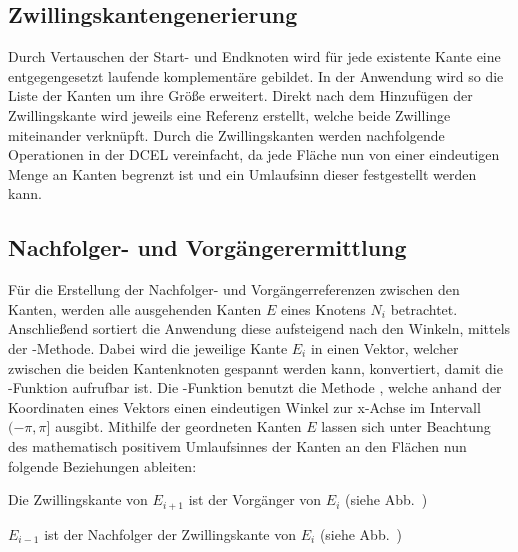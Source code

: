 \subsection{Zwillingskantengenerierung}
Durch Vertauschen der Start- und Endknoten wird für jede existente Kante eine entgegengesetzt laufende komplementäre  gebildet.
In der Anwendung wird so die Liste der Kanten um ihre Größe erweitert.
Direkt nach dem Hinzufügen der Zwillingskante wird jeweils eine Referenz erstellt, welche beide Zwillinge miteinander verknüpft.
Durch die Zwillingskanten werden nachfolgende Operationen in der DCEL vereinfacht, da jede Fläche nun von einer eindeutigen Menge an Kanten begrenzt ist und ein Umlaufsinn dieser festgestellt werden kann.

\subsection{Nachfolger- und Vorgängerermittlung}
Für die Erstellung der Nachfolger- und Vorgängerreferenzen zwischen den Kanten, werden alle ausgehenden Kanten $E$ eines Knotens $N_i$ betrachtet.
Anschließend sortiert die Anwendung diese aufsteigend nach den Winkeln, mittels der -Methode.
Dabei wird die jeweilige Kante $E_i$ in einen Vektor, welcher zwischen die beiden Kantenknoten gespannt werden kann, konvertiert, damit die -Funktion aufrufbar ist.
Die -Funktion benutzt die Methode , welche anhand der Koordinaten eines Vektors einen eindeutigen Winkel zur x-Achse im Intervall $(-\pi,\pi]$ ausgibt.
Mithilfe der geordneten Kanten $E$ lassen sich unter Beachtung des mathematisch positivem Umlaufsinnes der Kanten an den Flächen nun folgende Beziehungen ableiten:

\begin{compactenum}
	\item Die Zwillingskante von $E_{i+1}$ ist der Vorgänger von $E_i$ (siehe Abb.~\thebildnrnext)
	\item $E_{i-1}$ ist der Nachfolger der Zwillingskante von $E_i$ (siehe Abb.~\thebildnrnext)
\end{compactenum}


